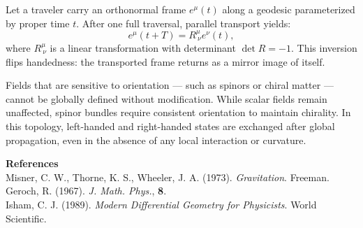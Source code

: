 \begin{technical}
Let a traveler carry an orthonormal frame \(e^\mu(t)\) along a geodesic parameterized by proper time \(t\). After one full traversal, parallel transport yields:
\[
e^\mu(t + T) = R^\mu_{\ \nu} e^\nu(t),
\]
where \(R^\mu_{\ \nu}\) is a linear transformation with determinant \(\det R = -1\). This inversion flips handedness: the transported frame returns as a mirror image of itself.

Fields that are sensitive to orientation — such as spinors or chiral matter — cannot be globally defined without modification. While scalar fields remain unaffected, spinor bundles require consistent orientation to maintain chirality. In this topology, left-handed and right-handed states are exchanged after global propagation, even in the absence of any local interaction or curvature.

\vspace{0.5em}
\noindent\textbf{References}\\
Misner, C. W., Thorne, K. S., Wheeler, J. A. (1973). \textit{Gravitation}. Freeman.\\
Geroch, R. (1967). \textit{J. Math. Phys.}, \textbf{8}.\\
Isham, C. J. (1989). \textit{Modern Differential Geometry for Physicists}. World Scientific.
\end{technical}
